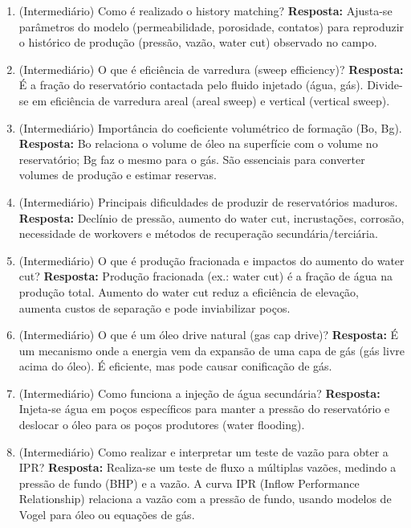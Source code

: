\documentclass[11pt,a4paper]{article}
\begin{document}
\begin{enumerate}
  \item (Intermediário) Como é realizado o history matching?
  \textbf{Resposta:} Ajusta-se parâmetros do modelo (permeabilidade, porosidade, contatos) para reproduzir o histórico de produção (pressão, vazão, water cut) observado no campo.

  \item (Intermediário) O que é eficiência de varredura (sweep efficiency)?
  \textbf{Resposta:} É a fração do reservatório contactada pelo fluido injetado (água, gás). Divide-se em eficiência de varredura areal (areal sweep) e vertical (vertical sweep).

  \item (Intermediário) Importância do coeficiente volumétrico de formação (Bo, Bg).
  \textbf{Resposta:} Bo relaciona o volume de óleo na superfície com o volume no reservatório; Bg faz o mesmo para o gás. São essenciais para converter volumes de produção e estimar reservas.

  \item (Intermediário) Principais dificuldades de produzir de reservatórios maduros.
  \textbf{Resposta:} Declínio de pressão, aumento do water cut, incrustações, corrosão, necessidade de workovers e métodos de recuperação secundária/terciária.

  \item (Intermediário) O que é produção fracionada e impactos do aumento do water cut?
  \textbf{Resposta:} Produção fracionada (ex.: water cut) é a fração de água na produção total. Aumento do water cut reduz a eficiência de elevação, aumenta custos de separação e pode inviabilizar poços.

  \item (Intermediário) O que é um óleo drive natural (gas cap drive)?
  \textbf{Resposta:} É um mecanismo onde a energia vem da expansão de uma capa de gás (gás livre acima do óleo). É eficiente, mas pode causar conificação de gás.

  \item (Intermediário) Como funciona a injeção de água secundária?
  \textbf{Resposta:} Injeta-se água em poços específicos para manter a pressão do reservatório e deslocar o óleo para os poços produtores (water flooding).

  \item (Intermediário) Como realizar e interpretar um teste de vazão para obter a IPR?
  \textbf{Resposta:} Realiza-se um teste de fluxo a múltiplas vazões, medindo a pressão de fundo (BHP) e a vazão. A curva IPR (Inflow Performance Relationship) relaciona a vazão com a pressão de fundo, usando modelos de Vogel para óleo ou equações de gás.


\end{enumerate}
\end{document}
